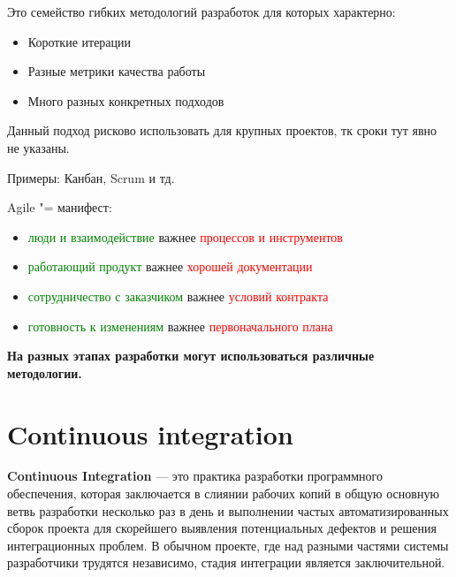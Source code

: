 \documentclass[bachelor, och, pract]{SCWorks}
\theoremstyle{remark}
\begin{document}
    Это семейство гибких методологий разработок для которых характерно:

    \begin{itemize}[label=$\bullet$]
        \item Короткие итерации
        \item Разные метрики качества работы
        \item Много разных конкретных подходов
    \end{itemize}

    Данный подход рисково использовать для крупных проектов, тк сроки тут явно не указаны.

    Примеры: Канбан, Scrum и тд.

    Agile "= манифест:

    \begin{itemize}[label=$\bullet$]
        \item \textcolor{green}{люди и взаимодействие} важнее \textcolor{red}{процессов и инструментов}
        \item \textcolor{green}{работающий продукт} важнее \textcolor{red}{хорошей документации}
        \item \textcolor{green}{сотрудничество с заказчиком} важнее \textcolor{red}{условий контракта}
        \item \textcolor{green}{готовность к изменениям} важнее \textcolor{red}{первоначального плана}
    \end{itemize}

    \textbf{На разных этапах разработки могут использоваться различные методологии.}

    \section{Continuous integration}
    
    
    \textbf{Continuous Integration} — это практика разработки программного обеспечения, которая заключается в слиянии рабочих копий в общую основную ветвь разработки несколько раз в день и выполнении частых автоматизированных сборок проекта для скорейшего выявления потенциальных дефектов и решения интеграционных проблем. В обычном проекте, где над разными частями системы разработчики трудятся независимо, стадия интеграции является заключительной.
\end{document}
